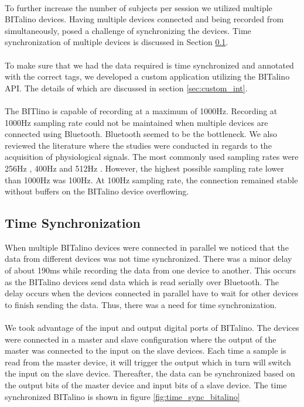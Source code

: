 \paragraph{}
To further increase the number of subjects per session we utilized multiple BITalino devices. Having multiple devices connected and being recorded from simultaneously, posed a challenge of synchronizing the devices. Time synchronization of multiple devices is discussed in Section \ref{sec:time_sync}.
\paragraph{}
To make sure that we had the data required is time synchronized and annotated with the correct tags, we developed a custom application utilizing the BITalino API. The details of which are discussed in section \ref{sec:custom_int}.
\paragraph{}
The BITlino is capable of recording at a maximum of 1000Hz. Recording at 1000Hz sampling rate could not be maintained when multiple devices are connected using Bluetooth. Bluetooth seemed to be the bottleneck. We also reviewed the literature where the studies were conducted in regards to the acquisition of physiological signals. The most commonly used sampling rates were 256Hz \cite{kim_emotion_2004} \cite{kim_emotion_2008}, 400Hz \cite{w_wen_2014} and 512Hz \cite{koelstra_deap:_2012}. However, the highest possible sampling rate lower than 1000Hz was 100Hz. At 100Hz sampling rate, the connection remained stable without buffers on the BITalino device overflowing.

\subsection{Time Synchronization}
\label{sec:time_sync}
When multiple BITalino devices were connected in parallel we noticed that the data from different devices was not time synchronized. There was a minor delay of about 190ms while recording the data from one device to another. This occurs as the BITalino devices send data which is read serially over Bluetooth. The delay occurs when the devices connected in parallel have to wait for other devices to finish sending the data. Thus, there was a need for time synchronization. 
\paragraph{}
We took advantage of the input and output digital ports of BITalino. The devices were connected in a master and slave configuration where the output of the master was connected to the input on the slave devices. Each time a sample is read from the master device, it will trigger the output which in turn will switch the input on the slave device. Thereafter, the data can be synchronized based on the output bits of the master device and input bits of a slave device. The time synchronized BITalino is shown in figure \ref{fig:time_sync_bitalino}

